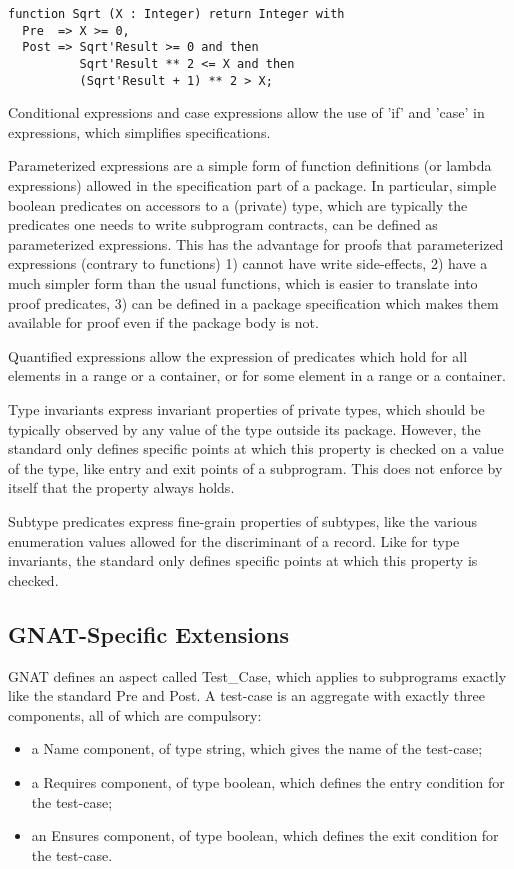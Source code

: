 \documentclass{article}
\begin{document}
\begin{verbatim}
function Sqrt (X : Integer) return Integer with
  Pre  => X >= 0,
  Post => Sqrt'Result >= 0 and then
          Sqrt'Result ** 2 <= X and then
          (Sqrt'Result + 1) ** 2 > X;
\end{verbatim}

Conditional expressions and case expressions allow the use of 'if' and 'case'
in expressions, which simplifies specifications.

Parameterized expressions are a simple form of function definitions (or lambda
expressions) allowed in the specification part of a package. In particular,
simple boolean predicates on accessors to a (private) type, which are typically
the predicates one needs to write subprogram contracts, can be defined as
parameterized expressions. This has the advantage for proofs that parameterized
expressions (contrary to functions) 1) cannot have write side-effects, 2) have
a much simpler form than the usual functions, which is easier to translate into
proof predicates, 3) can be defined in a package specification which makes them
available for proof even if the package body is not.

Quantified expressions allow the expression of predicates which hold for all
elements in a range or a container, or for some element in a range or a
container.

Type invariants express invariant properties of private types, which should be
typically observed by any value of the type outside its package. However, the
standard only defines specific points at which this property is checked on a
value of the type, like entry and exit points of a subprogram. This does not
enforce by itself that the property always holds.

Subtype predicates express fine-grain properties of subtypes, like the various
enumeration values allowed for the discriminant of a record. Like for type
invariants, the standard only defines specific points at which this property is
checked.

\subsection{GNAT-Specific Extensions}

GNAT defines an aspect called Test\_Case, which applies to subprograms exactly
like the standard Pre and Post. A test-case is an aggregate with exactly three
components, all of which are compulsory:
\begin{itemize}
\item a Name component, of type string, which gives the name of the test-case;
\item a Requires component, of type boolean, which defines the entry condition
  for the test-case;
\item an Ensures component, of type boolean, which defines the exit condition
  for the test-case.
\end{itemize}
\end{document}
